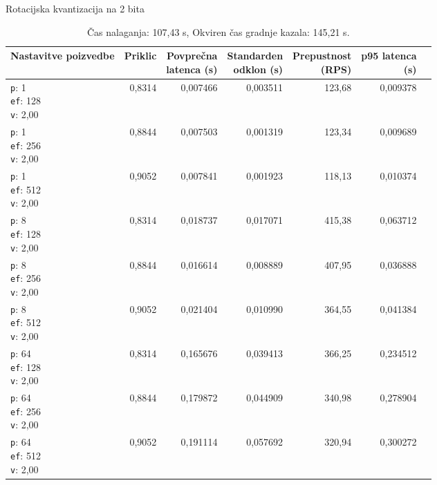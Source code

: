 \begin{table}[htbp]
  \centering
\small
  \caption{Rotacijska kvantizacija na 2 bita}
  \label{tab:single-2cpu-4ram:tq2-2:qdrant-dipl-baseline-tenant-subgraph-tq2-m16-ef-128-random-768-100-tenants-extended-upload-2026-08-18-08-02-41.json}
  \begin{tabularx}{\textwidth}{Xrrrrrr}
    \toprule
    Nastavitve poizvedbe & Priklic & \makecell{Povprečna\\latenca (s)} & \makecell{Standarden\\odklon (s)} & \makecell{Prepustnost\\(RPS)} & \makecell{p95 latenca\\(s)}  \\
    \midrule
    \makecell{\texttt{p}: 1\\\texttt{ef}: 128\\\texttt{v}: 2,00} & 0,8314 & 0,007466 & 0,003511 & 123,68 & 0,009378 \\
    \makecell{\texttt{p}: 1\\\texttt{ef}: 256\\\texttt{v}: 2,00} & 0,8844 & 0,007503 & 0,001319 & 123,34 & 0,009689 \\
    \makecell{\texttt{p}: 1\\\texttt{ef}: 512\\\texttt{v}: 2,00} & 0,9052 & 0,007841 & 0,001923 & 118,13 & 0,010374 \\
    \makecell{\texttt{p}: 8\\\texttt{ef}: 128\\\texttt{v}: 2,00} & 0,8314 & 0,018737 & 0,017071 & 415,38 & 0,063712 \\
    \makecell{\texttt{p}: 8\\\texttt{ef}: 256\\\texttt{v}: 2,00} & 0,8844 & 0,016614 & 0,008889 & 407,95 & 0,036888 \\
    \makecell{\texttt{p}: 8\\\texttt{ef}: 512\\\texttt{v}: 2,00} & 0,9052 & 0,021404 & 0,010990 & 364,55 & 0,041384 \\
    \makecell{\texttt{p}: 64\\\texttt{ef}: 128\\\texttt{v}: 2,00} & 0,8314 & 0,165676 & 0,039413 & 366,25 & 0,234512 \\
    \makecell{\texttt{p}: 64\\\texttt{ef}: 256\\\texttt{v}: 2,00} & 0,8844 & 0,179872 & 0,044909 & 340,98 & 0,278904 \\
    \makecell{\texttt{p}: 64\\\texttt{ef}: 512\\\texttt{v}: 2,00} & 0,9052 & 0,191114 & 0,057692 & 320,94 & 0,300272 \\
    \bottomrule
  \end{tabularx}
\caption* {Čas nalaganja: 107,43 s, Okviren čas gradnje kazala: 145,21 s.}\end{table}

